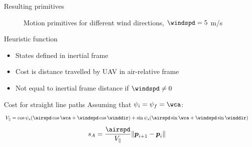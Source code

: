 \documentclass{beamer}
\renewcommand{\vec}[1]{
    \boldsymbol{#1}
}
\begin{document}
\begin{frame}{Resulting primitives}
    \begin{figure}
        \begin{center}
        \end{center}
        \caption{Motion primitives for different wind directions, $\windspd=5$ m/s}
        \label{fig:motion_prims}
    \end{figure}
\end{frame}

\begin{frame}{Heuristic function}
    \begin{itemize}
        \item States defined in inertial frame
        \item Cost is distance travelled by \ac{UAV} in air-relative frame
        \item Not equal to inertial frame distance if $\windspd\neq0$
    \end{itemize}
\end{frame}

\begin{frame}{Cost for straight line paths}
    Assuming that $\psi_i=\psi_f=\wca$:
    \begin{equation}
        V_{\parallel}=\cos\psi_s(\airspd\cos\wca+\windspd\cos\winddir) + \sin\psi_s(\airspd\sin\wca+\windspd\sin\winddir)
    \end{equation}
    \begin{equation}
        s_A=\frac{\airspd}{V_\parallel}\|\vec{p}_{i+1}-\vec{p}_{i}\|
    \end{equation}
\end{frame}
\end{document}
